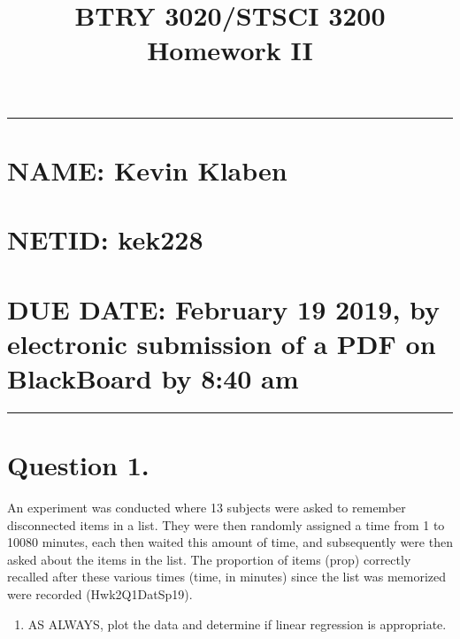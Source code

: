 \documentclass[12pt,]{article}
\title{BTRY 3020/STSCI 3200 Homework II}
\author{}
\date{}
\providecommand{\tightlist}{%
  \setlength{\itemsep}{0pt}\setlength{\parskip}{0pt}}
\begin{document}
\maketitle

\begin{center}\rule{0.5\linewidth}{\linethickness}\end{center}

\section{NAME: Kevin Klaben}\label{name-kevin-klaben}

\section{NETID: kek228}\label{netid-kek228}

\section{\texorpdfstring{\textbf{DUE DATE: February 19 2019, by
electronic submission of a PDF on BlackBoard by 8:40
am}}{DUE DATE: February 19 2019, by electronic submission of a PDF on BlackBoard by 8:40 am}}\label{due-date-february-19-2019-by-electronic-submission-of-a-pdf-on-blackboard-by-840-am}

\begin{center}\rule{0.5\linewidth}{\linethickness}\end{center}

\section{Question 1.}\label{question-1.}

An experiment was conducted where 13 subjects were asked to remember
disconnected items in a list. They were then randomly assigned a time
from 1 to 10080 minutes, each then waited this amount of time, and
subsequently were then asked about the items in the list. The proportion
of items (prop) correctly recalled after these various times (time, in
minutes) since the list was memorized were recorded (Hwk2Q1DatSp19).

\begin{enumerate}
\def\labelenumi{\alph{enumi})}
\tightlist
\item
  AS ALWAYS, plot the data and determine if linear regression is
  appropriate.
\end{enumerate}
\end{document}
